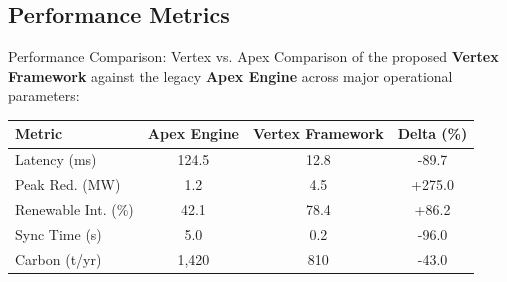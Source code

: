 \subsection{Performance Metrics}

\begin{frame}{Performance Comparison: Vertex vs. Apex}
  Comparison of the proposed \textbf{Vertex Framework} against the legacy \textbf{Apex Engine} across major operational parameters:
  \vspace{0.3cm}
  
  \centering
  \footnotesize
  \begin{tabular}{lccc}
    \toprule
    \textbf{Metric} & \textbf{Apex Engine} & \textbf{Vertex Framework} & \textbf{Delta (\%)} \\
    \midrule
    Latency (ms) & 124.5 & 12.8 & -89.7 \\
    Peak Red. (MW) & 1.2 & 4.5 & +275.0 \\
    Renewable Int. (\%) & 42.1 & 78.4 & +86.2 \\
    Sync Time (s) & 5.0 & 0.2 & -96.0 \\
    Carbon (t/yr) & 1,420 & 810 & -43.0 \\
    \bottomrule
  \end{tabular}
\end{frame}

